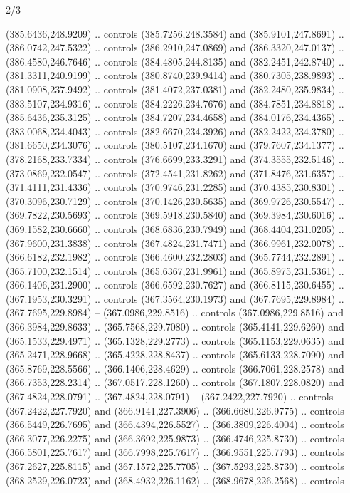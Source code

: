 \begin{flagdescription}{2/3}
\begin{scope}[xshift=0.5\flaglength,yshift=0.5\flagwidth,scale=\flagwidth/495.65]
\begin{scope}[y=0.8pt, x=0.8pt, yscale=-1,shift={(-463.76,-309.78)}]
  (385.6436,248.9209) .. controls (385.7256,248.3584) and (385.9101,247.8691) ..
  (386.0742,247.5322) .. controls (386.2910,247.0869) and (386.3320,247.0137) ..
  (386.4580,246.7646) .. controls (384.4805,244.8135) and (382.2451,242.8740) ..
  (381.3311,240.9199) .. controls (380.8740,239.9414) and (380.7305,238.9893) ..
  (381.0908,237.9492) .. controls (381.4072,237.0381) and (382.2480,235.9834) ..
  (383.5107,234.9316) .. controls (384.2226,234.7676) and (384.7851,234.8818) ..
  (385.6436,235.3125) .. controls (384.7207,234.4658) and (384.0176,234.4365) ..
  (383.0068,234.4043) .. controls (382.6670,234.3926) and (382.2422,234.3780) ..
  (381.6650,234.3076) .. controls (380.5107,234.1670) and (379.7607,234.1377) ..
  (378.2168,233.7334) .. controls (376.6699,233.3291) and (374.3555,232.5146) ..
  (373.0869,232.0547) .. controls (372.4541,231.8262) and (371.8476,231.6357) ..
  (371.4111,231.4336) .. controls (370.9746,231.2285) and (370.4385,230.8301) ..
  (370.3096,230.7129) .. controls (370.1426,230.5635) and (369.9726,230.5547) ..
  (369.7822,230.5693) .. controls (369.5918,230.5840) and (369.3984,230.6016) ..
  (369.1582,230.6660) .. controls (368.6836,230.7949) and (368.4404,231.0205) ..
  (367.9600,231.3838) .. controls (367.4824,231.7471) and (366.9961,232.0078) ..
  (366.6182,232.1982) .. controls (366.4600,232.2803) and (365.7744,232.2891) ..
  (365.7100,232.1514) .. controls (365.6367,231.9961) and (365.8975,231.5361) ..
  (366.1406,231.2900) .. controls (366.6592,230.7627) and (366.8115,230.6455) ..
  (367.1953,230.3291) .. controls (367.3564,230.1973) and (367.7695,229.8984) ..
  (367.7695,229.8984) -- (367.0986,229.8516) .. controls (367.0986,229.8516) and
  (366.3984,229.8633) .. (365.7568,229.7080) .. controls (365.4141,229.6260) and
  (365.1533,229.4971) .. (365.1328,229.2773) .. controls (365.1153,229.0635) and
  (365.2471,228.9668) .. (365.4228,228.8437) .. controls (365.6133,228.7090) and
  (365.8769,228.5566) .. (366.1406,228.4629) .. controls (366.7061,228.2578) and
  (366.7353,228.2314) .. (367.0517,228.1260) .. controls (367.1807,228.0820) and
  (367.4824,228.0791) .. (367.4824,228.0791) -- (367.2422,227.7920) .. controls
  (367.2422,227.7920) and (366.9141,227.3906) .. (366.6680,226.9775) .. controls
  (366.5449,226.7695) and (366.4394,226.5527) .. (366.3809,226.4004) .. controls
  (366.3077,226.2275) and (366.3692,225.9873) .. (366.4746,225.8730) .. controls
  (366.5801,225.7617) and (366.7998,225.7617) .. (366.9551,225.7793) .. controls
  (367.2627,225.8115) and (367.1572,225.7705) .. (367.5293,225.8730) .. controls
  (368.2529,226.0723) and (368.4932,226.1162) .. (368.9678,226.2568) .. controls

\end{scope}
\end{scope}
\end{flagdescription}
